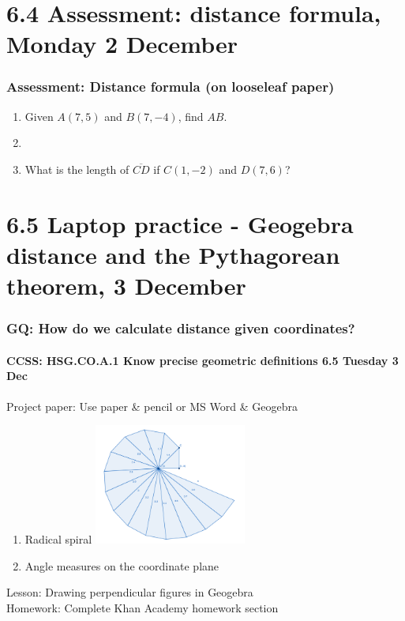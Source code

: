 \documentclass{beamer}
\begin{document}
  \section{6.4 Assessment: distance formula, Monday 2 December}
  \frame
  {
    \frametitle{Assessment: Distance formula (on looseleaf paper)}
    \begin{enumerate}
      \item Given $A(7,5)$ and $B(7,-4)$, find $AB$. \hspace{0.5cm}
        \vspace{0.5cm}
      \item 
      \item What is the length of $\overline{CD}$ if $C(1,-2)$ and $D(7,6)$?
    \end{enumerate}
  }

  \section{6.5 Laptop practice - Geogebra distance and the Pythagorean theorem, 3 December}
  \frame
  {
  \frametitle{GQ: How do we calculate distance given coordinates?}
  \framesubtitle{CCSS: HSG.CO.A.1 Know precise geometric definitions \hfill \alert{6.5 Tuesday 3 Dec}}
  
  \begin{block}{Project paper: Use paper \& pencil or MS Word \& Geogebra}
  \begin{enumerate}
    \item Radical spiral
    \includegraphics[width=5cm]{6-5CW_Radical-spiral.png}
    \item Angle measures on the coordinate plane
  \end{enumerate}
  \end{block}
  Lesson: Drawing perpendicular figures in Geogebra\\[0.5cm]
  Homework: Complete Khan Academy homework section
  }
\end{document}
